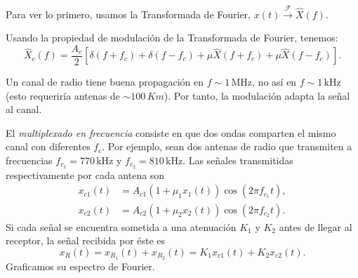 Para ver lo primero, usamos la Transformada de Fourier,
$x(t)\xrightarrow{\mathcal{F}}\hat{X}(f)$.
\begin{figure}[htb]
    \centering
\end{figure}
\FloatBarrier

Usando la propiedad de modulación de la Transformada de Fourier,
tenemos:
\[\hat{X}_c(f)=\frac{A_c}{2}\left[\delta(f+f_c)+\delta(f-f_c)+\mu\hat{X}(f+f_c)+\mu\hat{X}(f-f_c)\right].\]

\begin{figure}[htb]
    \centering
\end{figure}
\FloatBarrier

Un canal de radio tiene buena propagación en $f\sim 1\,\unit{\MHz}$, no
así en $f\sim 1\,\unit{\kHz}$
 (esto requeriría antenas de $\sim 100\,Km$). Por tanto, la modulación adapta la señal al canal.

El {\em multiplexado en frecuencia} consiste en que dos ondas
comparten el mismo canal con diferentes $f_c$. Por ejemplo, sean
dos antenas de radio que transmiten a frecuencias
$f_{c_1}=770\,\unit{\kHz}$ y $f_{c_2}=810\,\unit{\kHz}$. Las señales transmitidas
respectivamente por cada antena son
\begin{align*}
x_{c1}(t)&=A_{c1}\left(1+\mu_1x_1(t)\right)\cos(2\pi f_{c_1}t),\\
x_{c2}(t)&=A_{c2}\left(1+\mu_2x_2(t)\right)\cos(2\pi f_{c_2}t).
\end{align*}
Si cada señal se encuentra sometida a una atenuación $K_1$ y $K_2$
antes de llegar al receptor, la señal recibida por éste es
\[x_R(t)=x_{R_1}(t)+x_{R_2}(t)=K_1x_{c1}(t)+K_2x_{c2}(t).\]
Graficamos su espectro de Fourier.

